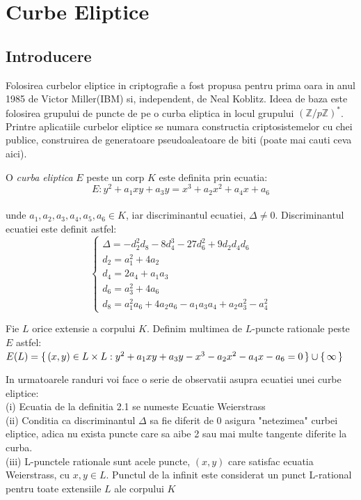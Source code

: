 \chapter{Curbe Eliptice} 
\section{Introducere}
\label{sec:sec01}
Folosirea curbelor eliptice in criptografie a fost propusa pentru prima oara in anul 1985 de Victor Miller(IBM) si, independent, de Neal Koblitz. Ideea de baza este folosirea grupului de puncte de pe o curba eliptica in locul grupului $(\mathbb{Z}/p\mathbb{Z})^{*}$. Printre aplicatiile curbelor eliptice se numara constructia criptosistemelor cu chei publice, construirea de generatoare pseudoaleatoare de biti (poate mai cauti ceva aici).
\begin{dfn}
O \textit{curba eliptica} $E$ peste un corp $K$ este definita prin ecuatia:
$$E : y^2 + a_1xy + a_3y = x^3 + a_2x^{2} + a_4x + a_6$$ 
\\unde $a_1, a_2, a_3, a_4, a_5, a_6\in K$, iar discriminantul ecuatiei, $\Delta \neq 0$. Discriminantul ecuatiei este definit astfel:
$$ \begin{cases}
\Delta = -d_2^{2}d_8 - 8d_4^{3} - 27d_6^{2} + 9d_2d_4d_6 \\
d_2 = a_1^{2} + 4a_2 \\
d_4 = 2a_4 + a_1a_3 \\
d_6 = a_3^{2} + 4a_6 \\
d_8 = a_1^{2}a_6 + 4a_2a_6 - a_1a_3a_4 + a_2a_3^{2} - a_4^{2}
\end{cases}$$
\end{dfn}
\begin{dfn}
Fie $L$ orice extensie a corpului $K$. Definim multimea de $L$-puncte rationale peste $E$ astfel: $E(L) = \set {(x, y)\in L\times L: y^2 + a_1xy + a_3y - x^3 - a_2x^{2} - a_4x - a_6 = 0} \cup \set {\infty}$
\end{dfn}
\begin{obs}
In urmatoarele randuri voi face o serie de observatii asupra ecuatiei unei curbe eliptice: \\
(i) Ecuatia de la definitia 2.1 se numeste Ecuatie Weierstrass \\
(ii) Conditia ca discriminantul $\Delta$ sa fie diferit de 0 asigura "netezimea" curbei eliptice, adica nu exista puncte care sa aibe 2 sau mai multe tangente diferite la curba. \\
(iii) L-punctele rationale sunt acele puncte, $(x, y)$ care satisfac ecuatia Weierstrass, cu $x, y \in L$. Punctul de la infinit este considerat un punct L-rational pentru toate extensiile $L$ ale corpului $K$
\end{obs}

